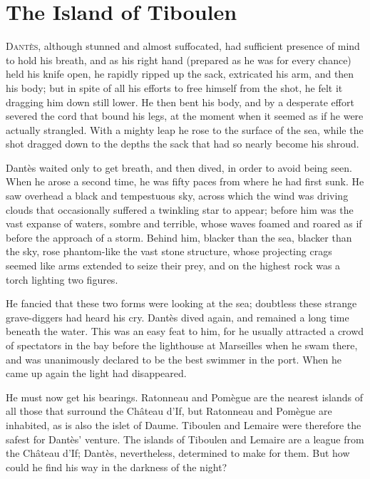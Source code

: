\chapter{The Island of Tiboulen} 

 \lettrine{D}{antès}, although stunned and almost suffocated, had sufficient presence of mind to hold his breath, and as his right hand (prepared as he was for every chance) held his knife open, he rapidly ripped up the sack, extricated his arm, and then his body; but in spite of all his efforts to free himself from the shot, he felt it dragging him down still lower. He then bent his body, and by a desperate effort severed the cord that bound his legs, at the moment when it seemed as if he were actually strangled. With a mighty leap he rose to the surface of the sea, while the shot dragged down to the depths the sack that had so nearly become his shroud. 

 Dantès waited only to get breath, and then dived, in order to avoid being seen. When he arose a second time, he was fifty paces from where he had first sunk. He saw overhead a black and tempestuous sky, across which the wind was driving clouds that occasionally suffered a twinkling star to appear; before him was the vast expanse of waters, sombre and terrible, whose waves foamed and roared as if before the approach of a storm. Behind him, blacker than the sea, blacker than the sky, rose phantom-like the vast stone structure, whose projecting crags seemed like arms extended to seize their prey, and on the highest rock was a torch lighting two figures. 

 He fancied that these two forms were looking at the sea; doubtless these strange grave-diggers had heard his cry. Dantès dived again, and remained a long time beneath the water. This was an easy feat to him, for he usually attracted a crowd of spectators in the bay before the lighthouse at Marseilles when he swam there, and was unanimously declared to be the best swimmer in the port. When he came up again the light had disappeared. 

 He must now get his bearings. Ratonneau and Pomègue are the nearest islands of all those that surround the Château d'If, but Ratonneau and Pomègue are inhabited, as is also the islet of Daume. Tiboulen and Lemaire were therefore the safest for Dantès' venture. The islands of Tiboulen and Lemaire are a league from the Château d'If; Dantès, nevertheless, determined to make for them. But how could he find his way in the darkness of the night? 

